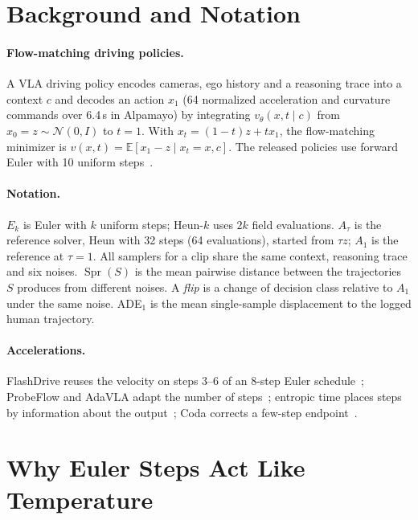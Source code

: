 \documentclass{article}
\theoremstyle{plain}
\theoremstyle{definition}
\theoremstyle{remark}
\newcommand{\Aref}{A_{1}}
\newcommand{\Atau}{A_{\tau}}
\newcommand{\Spr}{\operatorname{Spr}}
\newcommand{\E}{\mathbb{E}}
\begin{document}
\section{Background and Notation}
\label{sec:background}

\paragraph{Flow-matching driving policies.} A VLA driving policy encodes cameras, ego history and a reasoning trace into a context $c$ and decodes an action $x_1$ (64 normalized acceleration and curvature commands over 6.4\,s in Alpamayo) by integrating $v_\theta(x,t\mid c)$ from $x_0=z\sim\mathcal{N}(0,I)$ to $t=1$. With $x_t=(1-t)z+tx_1$, the flow-matching minimizer is $v(x,t)=\E[x_1-z\mid x_t=x,c]$. The released policies use forward Euler with 10 uniform steps~\citep{alpamayo2025,qwendrive2026}.

\paragraph{Notation.} $E_k$ is Euler with $k$ uniform steps; Heun-$k$ uses $2k$ field evaluations. $\Atau$ is the reference solver, Heun with 32 steps (64 evaluations), started from $\tau z$; $\Aref$ is the reference at $\tau=1$. All samplers for a clip share the same context, reasoning trace and six noises. $\Spr(S)$ is the mean pairwise distance between the trajectories $S$ produces from different noises. A \emph{flip} is a change of decision class relative to $\Aref$ under the same noise. ADE$_1$ is the mean single-sample displacement to the logged human trajectory.

\paragraph{Accelerations.} FlashDrive reuses the velocity on steps 3--6 of an 8-step Euler schedule~\citep{flashdrive2026}; ProbeFlow and AdaVLA adapt the number of steps~\citep{probeflow2026,adavla2026}; entropic time places steps by information about the output~\citep{stancevic2025entropic}; Coda corrects a few-step endpoint~\citep{coda2026}.

\section{Why Euler Steps Act Like Temperature}
\label{sec:theory}
\end{document}

